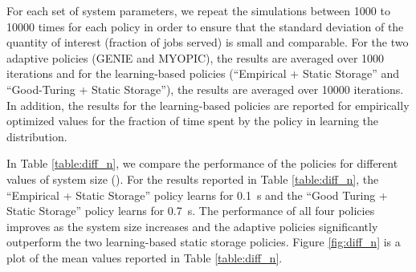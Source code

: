 \documentclass[10pt, conference, letterpaper]{IEEEtran}
\begin{document}
For each set of system parameters, we repeat the simulations between 1000 to 10000 times for each policy in order to ensure that the standard deviation of the quantity of interest (fraction of jobs served) is small and comparable. For the two adaptive policies (GENIE and MYOPIC), the results are averaged over 1000 iterations and for the learning-based policies (``Empirical + Static Storage'' and ``Good-Turing + Static Storage''), the results are averaged over 10000 iterations. In addition, the results for the learning-based policies are reported for empirically optimized values for the fraction of time spent by the policy in learning the distribution.




In Table \ref{table:diff_n}, we compare the performance of the policies for different values of system size (). For the results reported in Table \ref{table:diff_n}, the ``Empirical + Static Storage'' policy learns for 0.1~s and the ``Good Turing + Static Storage'' policy learns for 0.7~s. The performance of all four policies improves as the system size increases and the adaptive policies significantly outperform the two learning-based static storage policies. Figure \ref{fig:diff_n} is a plot of the mean values reported in Table \ref{table:diff_n}.
\end{document}
